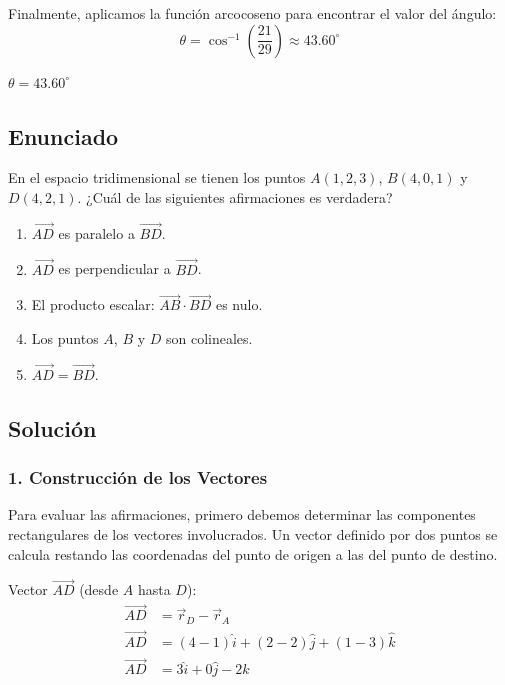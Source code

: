 \documentclass[12pt, a4paper]{article}
\begin{document}
Finalmente, aplicamos la función arcocoseno para encontrar el valor del ángulo:
$$ \theta = \cos^{-1}\left(\frac{21}{29}\right) \approx 43.60^\circ $$

\begin{tcolorbox}[colback=green!5!white, colframe=green!50!black, title=Respuesta Final]
\centering \Large $\theta = 43.60^\circ$
\end{tcolorbox}

\newpage

\subsection*{Enunciado}
En el espacio tridimensional se tienen los puntos $A(1,2,3)$, $B(4,0,1)$ y $D(4,2,1)$. ¿Cuál de las siguientes afirmaciones es verdadera?

\begin{enumerate}[label=\alph*)]
    \item $\vec{AD}$ es paralelo a $\vec{BD}$.
    \item $\vec{AD}$ es perpendicular a $\vec{BD}$.
    \item El producto escalar: $\vec{AB} \cdot \vec{BD}$ es nulo.
    \item Los puntos $A$, $B$ y $D$ son colineales.
    \item $\vec{AD} = \vec{BD}$.
\end{enumerate}

\subsection*{Solución}

\subsubsection*{1. Construcción de los Vectores}
Para evaluar las afirmaciones, primero debemos determinar las componentes rectangulares de los vectores involucrados. Un vector definido por dos puntos se calcula restando las coordenadas del punto de origen a las del punto de destino.

Vector $\vec{AD}$ (desde $A$ hasta $D$):
\begin{align*}
    \vec{AD} &= \vec{r}_D - \vec{r}_A \\
    \vec{AD} &= (4 - 1)\hat{i} + (2 - 2)\hat{j} + (1 - 3)\hat{k} \\
    \vec{AD} &= 3\hat{i} + 0\hat{j} - 2\hat{k}
\end{align*}
\end{document}
